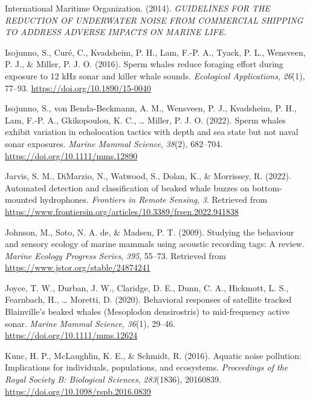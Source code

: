 \documentclass[
]{article}
\newlength{\cslhangindent}
\newlength{\cslentryspacingunit} %
\newenvironment{CSLReferences}[2] %
 {%
  \setlength{\parindent}{0pt}
  \ifodd #1
  \let\oldpar\par
  \def\par{\hangindent=\cslhangindent\oldpar}
  \fi
  \setlength{\parskip}{#2\cslentryspacingunit}
 }%
 {}
\begin{document}
\begin{CSLReferences}{1}{0}
\leavevmode{}%
International Maritime Organization. (2014). \emph{GUIDELINES FOR THE
REDUCTION OF UNDERWATER NOISE FROM COMMERCIAL SHIPPING TO ADDRESS
ADVERSE IMPACTS ON MARINE LIFE}.

\leavevmode{}%
Isojunno, S., Curé, C., Kvadsheim, P. H., Lam, F.-P. A., Tyack, P. L.,
Wensveen, P. J., \& Miller, P. J. O. (2016). Sperm whales reduce
foraging effort during exposure to 1{\textendash}2 kHz sonar and killer
whale sounds. \emph{Ecological Applications}, \emph{26}(1), 77--93.
\url{https://doi.org/10.1890/15-0040}

\leavevmode{}%
Isojunno, S., von Benda-Beckmann, A. M., Wensveen, P. J., Kvadsheim, P.
H., Lam, F.-P. A., Gkikopoulou, K. C., \ldots{} Miller, P. J. O. (2022).
Sperm whales exhibit variation in echolocation tactics with depth and
sea state but not naval sonar exposures. \emph{Marine Mammal Science},
\emph{38}(2), 682--704. \url{https://doi.org/10.1111/mms.12890}

\leavevmode{}%
Jarvis, S. M., DiMarzio, N., Watwood, S., Dolan, K., \& Morrissey, R.
(2022). Automated detection and classification of beaked whale buzzes on
bottom-mounted hydrophones. \emph{Frontiers in Remote Sensing},
\emph{3}. Retrieved from
\url{https://www.frontiersin.org/articles/10.3389/frsen.2022.941838}

\leavevmode{}%
Johnson, M., Soto, N. A. de, \& Madsen, P. T. (2009). Studying the
behaviour and sensory ecology of marine mammals using acoustic recording
tags: A review. \emph{Marine Ecology Progress Series}, \emph{395},
55--73. Retrieved from \url{https://www.jstor.org/stable/24874241}

\leavevmode{}%
Joyce, T. W., Durban, J. W., Claridge, D. E., Dunn, C. A., Hickmott, L.
S., Fearnbach, H., \ldots{} Moretti, D. (2020). Behavioral responses of
satellite tracked Blainville's beaked whales (Mesoplodon densirostris)
to mid-frequency active sonar. \emph{Marine Mammal Science},
\emph{36}(1), 29--46. \url{https://doi.org/10.1111/mms.12624}

\leavevmode{}%
Kunc, H. P., McLaughlin, K. E., \& Schmidt, R. (2016). Aquatic noise
pollution: Implications for individuals, populations, and ecosystems.
\emph{Proceedings of the Royal Society B: Biological Sciences},
\emph{283}(1836), 20160839. \url{https://doi.org/10.1098/rspb.2016.0839}


\end{CSLReferences}
\end{document}
